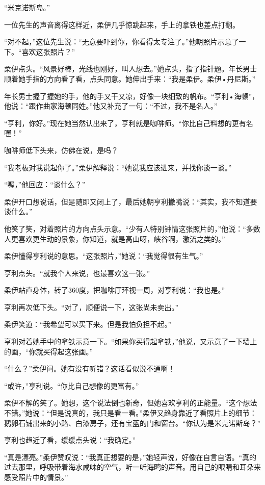 “米克诺斯岛。”

一位先生的声音离得这样近，柔伊几乎惊跳起来，手上的拿铁也差点打翻。

“对不起，”这位先生说：“无意要吓到你，你看得太专注了。”他朝照片示意了一下。“喜欢这张照片？”

柔伊点头。“风景好棒，光线也刚好，叫人想去。”她点头，指了指针题。年长男士顺着她手指的方向看了看，点头同意。她伸出手来：“我是柔伊。柔伊•丹尼斯。”

年长男士握了握她的手，他的手又干又凉，好像一块细致的帆布。“亨利•海顿”，他说：“跟作曲家海顿同姓。”他又补充了一句：“不过，我不是名人。”

“亨利，你好。”现在她当然认出来了，亨利就是咖啡师。“你比自己料想的更有名喔！”

咖啡师低下头来，仿佛在说，是吗？

“我老板对我说起你了。”柔伊解释说：“她说我应该进来，并找你谈一谈。”

“喔，”他回应：“谈什么？”

柔伊开口想说话，但是随即又闭上了，最后她朝亨利撇嘴说：“其实，我不知道要谈什么。”

他笑了笑，对着照片的方向点头示意。“少有人特别钟情这张照片的，”他说：“多数人更喜欢更生动的景象，你知道，就是高山呀，峡谷啊，激流之类的。”

柔伊懂得亨利说的意思。“这张照片，”她说：“我觉得很有生气。”

亨利点头。“就我个人来说，也最喜欢这一张。”

柔伊站直身体，转了360度，把咖啡厅环视一周，对亨利说：“我也是。”

亨利再次低下头。“对了，顺便说一下，这张尚未卖出。”

柔伊笑道：“我希望可以买下来。但是我怕负担不起。”

亨利对着她手中的拿铁示意一下。“如果你买得起拿铁，”他说，又示意了一下墙上的画，“你就买得起这张画。”

“什么？”柔伊问。她有没有听错？这话看似说不通啊！

“或许，”亨利说。“你比自己想像的更富有。”

柔伊不解的笑了。她想，这个说法倒也新奇，但她喜欢亨利的正能量。“这个想法不错。”她说：“但是说真的，我只是看一看。”柔伊又趋身靠近了看照片上的细节：鹅卵石铺出来的小路、白漆房子，还有宝蓝的门和窗台。“你认为是米克诺斯岛？”

亨利也趋近了看，缓缓点头说：“我确定。”

“真是漂亮。”柔伊赞叹说：“我真正想要的是，”她轻声说，好像在自言自语。“真的过去那里，呼吸带着海水咸味的空气，听一听海鸥的声音。用自己的眼睛和耳朵来感受照片中的情景。”

